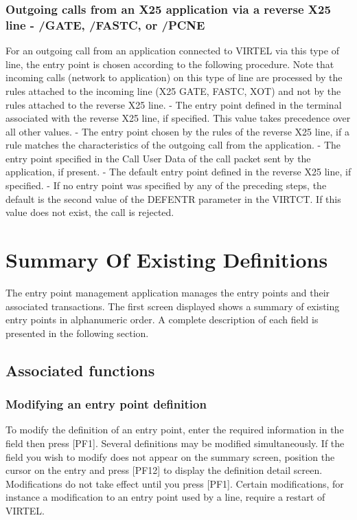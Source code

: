 \documentclass[letterpaper,10pt,english]{sphinxmanual}
\begin{document}
\subsubsection{Outgoing calls from an X25 application via a reverse X25 line - /GATE, /FASTC, or /PCNE}
\label{\detokenize{connectivity_guide:outgoing-calls-from-an-x25-application-via-a-reverse-x25-line-gate-fastc-or-pcne}}
For an outgoing call from an application connected to VIRTEL via this type of line, the entry point is chosen according
to the following procedure. Note that incoming calls (network to application) on this type of line are processed by the
rules attached to the incoming line (X25 GATE, FASTC, XOT) and not by the rules attached to the reverse X25 line.
- The entry point defined in the terminal associated with the reverse X25 line, if specified. This value takes precedence over all other values.
- The entry point chosen by the rules of the reverse X25 line, if a rule matches the characteristics of the outgoing call from the application.
- The entry point specified in the Call User Data of the call packet sent by the application, if present.
- The default entry point defined in the reverse X25 line, if specified.
- If no entry point was specified by any of the preceding steps, the default is the second value of the DEFENTR parameter in the VIRTCT. If this value does not exist, the call is rejected.


\section{Summary Of Existing Definitions}
\label{\detokenize{connectivity_guide:id8}}
The entry point management application manages the entry points and their associated transactions. The first screen displayed shows a summary of existing entry points in alphanumeric order. A complete description of each field is presented in the following section.




\subsection{Associated functions}
\label{\detokenize{connectivity_guide:id9}}

\subsubsection{Modifying an entry point definition}
\label{\detokenize{connectivity_guide:modifying-an-entry-point-definition}}
To modify the definition of an entry point, enter the required information in the field then press {[}PF1{]}. Several definitions may be modified simultaneously. If the field you wish to modify does not appear on the summary screen, position the cursor on the entry and press {[}PF12{]} to display the definition detail screen. Modifications do not take effect until you press {[}PF1{]}. Certain modifications, for instance a modification to an entry point used by a line, require a restart of VIRTEL.
\end{document}
